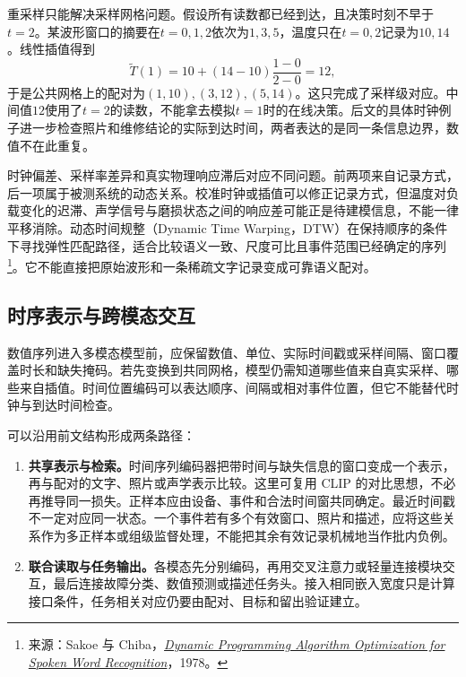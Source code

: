 重采样只能解决采样网格问题。假设所有读数都已经到达，且决策时刻不早于$t=2$。某波形窗口的摘要在$t=0,1,2$依次为$1,3,5$，温度只在$t=0,2$记录为$10,14$。线性插值得到
\begin{equation}
 \widetilde T(1)=10+(14-10)\frac{1-0}{2-0}=12,
\end{equation}
于是公共网格上的配对为$(1,10),(3,12),(5,14)$。这只完成了采样级对应。中间值$12$使用了$t=2$的读数，不能拿去模拟$t=1$时的在线决策。后文的具体时钟例子进一步检查照片和维修结论的实际到达时间，两者表达的是同一条信息边界，数值不在此重复。

时钟偏差、采样率差异和真实物理响应滞后对应不同问题。前两项来自记录方式，后一项属于被测系统的动态关系。校准时钟或插值可以修正记录方式，但温度对负载变化的迟滞、声学信号与磨损状态之间的响应差可能正是待建模信息，不能一律平移消除。动态时间规整（Dynamic Time Warping，DTW）在保持顺序的条件下寻找弹性匹配路径，适合比较语义一致、尺度可比且事件范围已经确定的序列\footnote{来源：Sakoe 与 Chiba，\href{https://doi.org/10.1109/TASSP.1978.1163055}{\textit{Dynamic Programming Algorithm Optimization for Spoken Word Recognition}}，1978。}。它不能直接把原始波形和一条稀疏文字记录变成可靠语义配对。

\subsection{时序表示与跨模态交互}
数值序列进入多模态模型前，应保留数值、单位、实际时间戳或采样间隔、窗口覆盖时长和缺失掩码。若先变换到共同网格，模型仍需知道哪些值来自真实采样、哪些来自插值。时间位置编码可以表达顺序、间隔或相对事件位置，但它不能替代时钟与到达时间检查。

可以沿用前文结构形成两条路径：
\begin{enumerate}[leftmargin=*]
\item \textbf{共享表示与检索。}时间序列编码器把带时间与缺失信息的窗口变成一个表示，再与配对的文字、照片或声学表示比较。这里可复用 CLIP 的对比思想，不必再推导同一损失。正样本应由设备、事件和合法时间窗共同确定。最近时间戳不一定对应同一状态。一个事件若有多个有效窗口、照片和描述，应将这些关系作为多正样本或组级监督处理，不能把其余有效记录机械地当作批内负例。
\item \textbf{联合读取与任务输出。}各模态先分别编码，再用交叉注意力或轻量连接模块交互，最后连接故障分类、数值预测或描述任务头。接入相同嵌入宽度只是计算接口条件，任务相关对应仍要由配对、目标和留出验证建立。
\end{enumerate}

